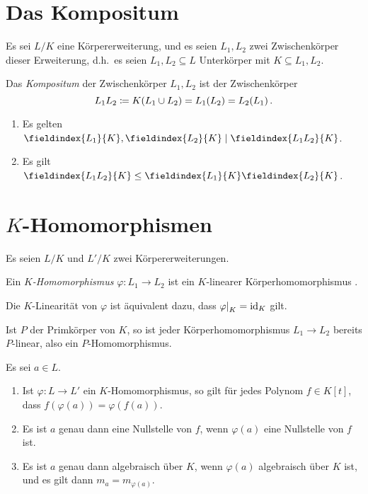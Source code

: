 \section{Das Kompositum}

Es sei $L/K$ eine Körpererweiterung, und es seien $L_1, L_2$ zwei Zwischenkörper dieser Erweiterung, d.h.\ es seien $L_1, L_2 \subseteq L$ Unterkörper mit $K \subseteq L_1, L_2$.

\begin{definition}
  Das \emph{Kompositum} der Zwischenkörper $L_1, L_2$ ist der Zwischenkörper
  \[
              L_1 L_2
    \coloneqq  K(L_1 \cup L_2)
    =         L_1(L_2)
    =         L_2(L_1) \,.
  \]
\end{definition}

\begin{lemma}
  \begin{enumerate}
    \item
      Es gelten $\fieldindex{L_1}{K}, \fieldindex{L_2}{K} \divides \fieldindex{L_1 L_2}{K}$.
    \item
      Es gilt $\fieldindex{L_1 L_2}{K} \leq \fieldindex{L_1}{K} \fieldindex{L_2}{K}$.
  \end{enumerate}
\end{lemma}





\section{\texorpdfstring{$K$}{K}-Homomorphismen}

Es seien $L/K$ und $L'/K$ zwei Körpererweiterungen.

\begin{definition}
  Ein \emph{$K$-Homomorphismus} $\varphi \colon L_1 \to L_2$ ist ein $K$-linearer Körperhomomorphismus .
\end{definition}

\begin{remark}
  Die $K$-Linearität von $\varphi$ ist äquivalent dazu, dass $\restrict{\varphi}{K} = \id_K$ gilt.
\end{remark}

\begin{example}
  Ist $P$ der Primkörper von $K$, so ist jeder Körperhomomorphismus $L_1 \to L_2$ bereits $P$-linear, also ein $P$-Homomorphismus.
\end{example}

\begin{lemma}
  Es sei $a \in L$.
  \begin{enumerate}
    \item
      Ist $\varphi \colon L \to L'$ ein $K$-Homomorphismus, so gilt für jedes Polynom $f \in K[t]$, dass $f(\varphi(a)) = \varphi(f(a))$.
    \item
      Es ist $a$ genau dann eine Nullstelle von $f$, wenn $\varphi(a)$ eine Nullstelle von $f$ ist.
    \item
      Es ist $a$ genau dann algebraisch über $K$, wenn $\varphi(a)$ algebraisch über $K$ ist, und es gilt dann $m_a = m_{\varphi(a)}$.
  \end{enumerate}
\end{lemma}

